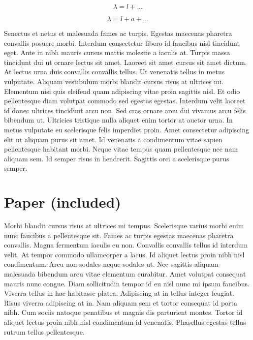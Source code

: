 \documentclass[paper = a4, fontsize = 12pt, numbers = noenddot, DIV = 15, twoside, 
paper = portrait,
listof = totoc,
listof = chapterentry,
egregdoesnotlikesansseriftitles, %
parskip = half %
]{scrbook}
\begin{document}
\begin{equation}
	\lambda = l + \ldots
\end{equation}

\begin{equation}
	\tag{showcase}
	\lambda = l + a + \ldots
\end{equation}

Senectus et netus et malesuada fames ac turpis. Egestas maecenas pharetra convallis posuere morbi. Interdum consectetur libero id faucibus nisl tincidunt eget. Ante in nibh mauris cursus mattis molestie a iaculis at. Turpis massa tincidunt dui ut ornare lectus sit amet. Laoreet sit amet cursus sit amet dictum. At lectus urna duis convallis convallis tellus. Ut venenatis tellus in metus vulputate. Aliquam vestibulum morbi blandit cursus risus at ultrices mi. Elementum nisi quis eleifend quam adipiscing vitae proin sagittis nisl. Et odio pellentesque diam volutpat commodo sed egestas egestas. Interdum velit laoreet id donec ultrices tincidunt arcu non. Sed cras ornare arcu dui vivamus arcu felis bibendum ut. Ultricies tristique nulla aliquet enim tortor at auctor urna. In metus vulputate eu scelerisque felis imperdiet proin. Amet consectetur adipiscing elit ut aliquam purus sit amet. Id venenatis a condimentum vitae sapien pellentesque habitant morbi. Neque vitae tempus quam pellentesque nec nam aliquam sem. Id semper risus in hendrerit. Sagittis orci a scelerisque purus semper.

\clearpage
\chapter{Paper (included)}

Morbi blandit cursus risus at ultrices mi tempus. Scelerisque varius morbi enim nunc faucibus a pellentesque sit. Fames ac turpis egestas maecenas pharetra convallis. Magna fermentum iaculis eu non. Convallis convallis tellus id interdum velit. At tempor commodo ullamcorper a lacus. Id aliquet lectus proin nibh nisl condimentum. Arcu non sodales neque sodales ut. Nec sagittis aliquam malesuada bibendum arcu vitae elementum curabitur. Amet volutpat consequat mauris nunc congue. Diam sollicitudin tempor id eu nisl nunc mi ipsum faucibus. Viverra tellus in hac habitasse platea. Adipiscing at in tellus integer feugiat. Risus viverra adipiscing at in. Nam aliquam sem et tortor consequat id porta nibh. Cum sociis natoque penatibus et magnis dis parturient montes. Tortor id aliquet lectus proin nibh nisl condimentum id venenatis. Phasellus egestas tellus rutrum tellus pellentesque.
\end{document}
